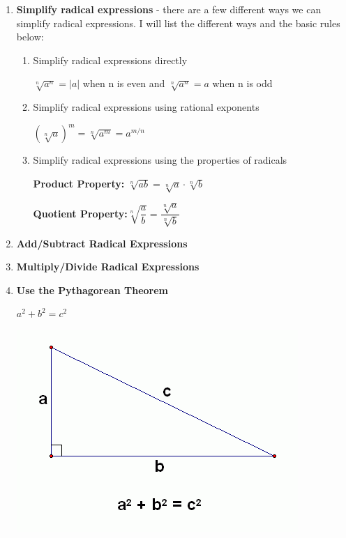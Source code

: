\documentclass[12pt]{article}
\begin{document}
\begin{enumerate}

\item \textbf{Simplify radical expressions} - there are a few different ways we can simplify radical expressions. I will list the different ways and the basic rules below:

\begin{enumerate}
\item Simplify radical expressions directly
\newline

\centerline{$\sqrt[n]{a^n} = |a|$ when n is even and $\sqrt[n]{a^{n}} = a$ when n is odd}

\item Simplify radical expressions using rational exponents
\newline

\centerline{$(\sqrt[n]{a})^{m} = \sqrt[n]{a^{m}} = a^{m/n}$}
\item Simplify radical expressions using the properties of radicals
\newline

\centerline{\textbf{Product Property:} $\sqrt[n]{ab} = \sqrt[n]{a} \cdot \sqrt[n]{b}$}
\centerline{\textbf{Quotient Property:}$\sqrt[n]{\dfrac{a}{b}} = \dfrac{\sqrt[n]{a}}{\sqrt[n]{b}}$}
\end{enumerate}

\item \textbf{Add/Subtract Radical Expressions}

\item \textbf{Multiply/Divide Radical Expressions}

\item \textbf{Use the Pythagorean Theorem}

\centerline{$a^2 + b^2 = c^2$}
\centerline{\includegraphics[scale = 0.5]{pythag.png}}

\end{enumerate}
\end{document}
